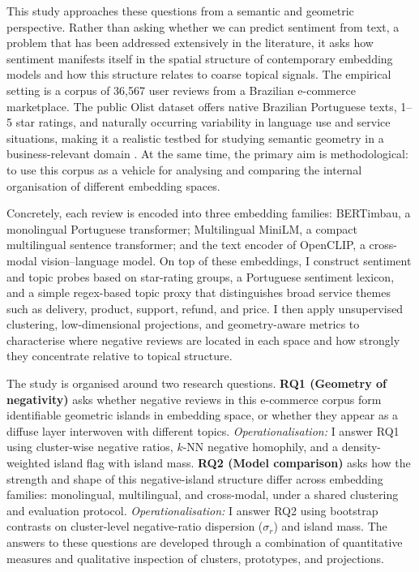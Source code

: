 \documentclass[a4paper,11pt]{article}
\begin{document}
This study approaches these questions from a semantic and geometric perspective. 
Rather than asking whether we can predict sentiment from text, a problem that has been addressed extensively in the literature, it asks how sentiment manifests itself in the spatial structure of contemporary embedding models and how this structure relates to coarse topical signals. 
The empirical setting is a corpus of 36{,}567 user reviews from a Brazilian e-commerce marketplace. 
The public Olist dataset offers native Brazilian Portuguese texts, 1–5 star ratings, and naturally occurring variability in language use and service situations, making it a realistic testbed for studying semantic geometry in a business-relevant domain \citep{olist_kaggle_dataset}. 
At the same time, the primary aim is methodological: to use this corpus as a vehicle for analysing and comparing the internal organisation of different embedding spaces.

Concretely, each review is encoded into three embedding families: BERTimbau, a monolingual Portuguese transformer; Multilingual MiniLM, a compact multilingual sentence transformer; and the text encoder of OpenCLIP, a cross-modal vision–language model. 
On top of these embeddings, I construct sentiment and topic probes based on star-rating groups, a Portuguese sentiment lexicon, and a simple regex-based topic proxy that distinguishes broad service themes such as delivery, product, support, refund, and price. 
I then apply unsupervised clustering, low-dimensional projections, and geometry-aware metrics to characterise where negative reviews are located in each space and how strongly they concentrate relative to topical structure.

The study is organised around two research questions. 
\textbf{RQ1 (Geometry of negativity)} asks whether negative reviews in this e-commerce corpus form identifiable geometric islands in embedding space, or whether they appear as a diffuse layer interwoven with different topics. 
\textit{Operationalisation:} I answer RQ1 using cluster-wise negative ratios, $k$-NN negative homophily, and a density-weighted island flag with island mass.
\textbf{RQ2 (Model comparison)} asks how the strength and shape of this negative-island structure differ across embedding families: monolingual, multilingual, and cross-modal, under a shared clustering and evaluation protocol. 
\textit{Operationalisation:} I answer RQ2 using bootstrap contrasts on cluster-level negative-ratio dispersion ($\sigma_r$) and island mass.
The answers to these questions are developed through a combination of quantitative measures and qualitative inspection of clusters, prototypes, and projections.
\end{document}
